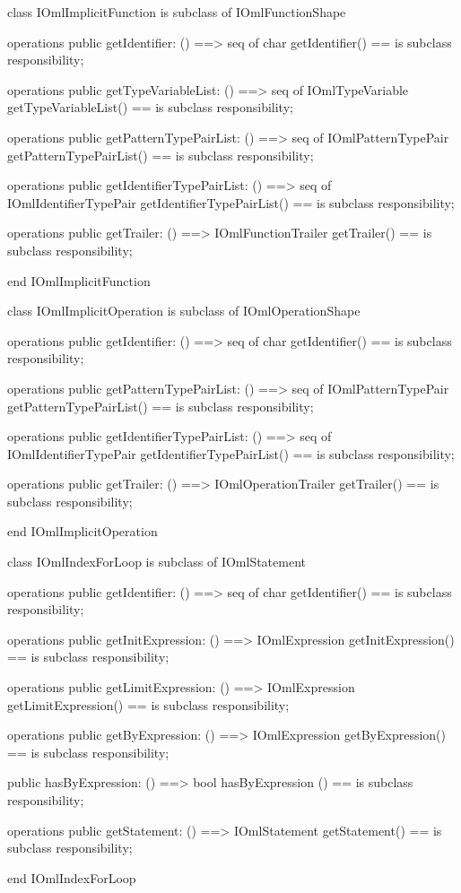 \begin{vdm_al}
class IOmlImplicitFunction
 is subclass of IOmlFunctionShape

operations
  public getIdentifier: () ==> seq of char
  getIdentifier() == is subclass responsibility;

operations
  public getTypeVariableList: () ==> seq of IOmlTypeVariable
  getTypeVariableList() == is subclass responsibility;

operations
  public getPatternTypePairList: () ==> seq of IOmlPatternTypePair
  getPatternTypePairList() == is subclass responsibility;

operations
  public getIdentifierTypePairList: () ==> seq of IOmlIdentifierTypePair
  getIdentifierTypePairList() == is subclass responsibility;

operations
  public getTrailer: () ==> IOmlFunctionTrailer
  getTrailer() == is subclass responsibility;

end IOmlImplicitFunction
\end{vdm_al}

\begin{vdm_al}
class IOmlImplicitOperation
 is subclass of IOmlOperationShape

operations
  public getIdentifier: () ==> seq of char
  getIdentifier() == is subclass responsibility;

operations
  public getPatternTypePairList: () ==> seq of IOmlPatternTypePair
  getPatternTypePairList() == is subclass responsibility;

operations
  public getIdentifierTypePairList: () ==> seq of IOmlIdentifierTypePair
  getIdentifierTypePairList() == is subclass responsibility;

operations
  public getTrailer: () ==> IOmlOperationTrailer
  getTrailer() == is subclass responsibility;

end IOmlImplicitOperation
\end{vdm_al}

\begin{vdm_al}
class IOmlIndexForLoop
 is subclass of IOmlStatement

operations
  public getIdentifier: () ==> seq of char
  getIdentifier() == is subclass responsibility;

operations
  public getInitExpression: () ==> IOmlExpression
  getInitExpression() == is subclass responsibility;

operations
  public getLimitExpression: () ==> IOmlExpression
  getLimitExpression() == is subclass responsibility;

operations
  public getByExpression: () ==> IOmlExpression
  getByExpression() == is subclass responsibility;

  public hasByExpression: () ==> bool
  hasByExpression () == is subclass responsibility;

operations
  public getStatement: () ==> IOmlStatement
  getStatement() == is subclass responsibility;

end IOmlIndexForLoop
\end{vdm_al}

